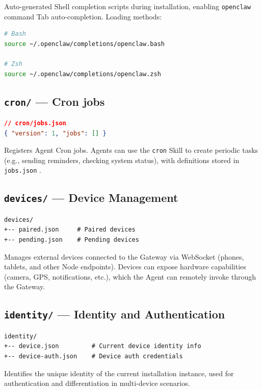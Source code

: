 Auto-generated Shell completion scripts during installation, enabling \texttt{openclaw} command Tab auto-completion. Loading methods:

\begin{lstlisting}[language=bash]
# Bash
source ~/.openclaw/completions/openclaw.bash

# Zsh
source ~/.openclaw/completions/openclaw.zsh
\end{lstlisting}

\subsection{\texttt{cron/} --- Cron jobs}


\begin{lstlisting}[language=json]
// cron/jobs.json
{ "version": 1, "jobs": [] }
\end{lstlisting}

Registers Agent Cron jobs. Agents can use the \texttt{cron}  Skill to create periodic tasks (e.g., sending reminders, checking system status), with definitions stored in \texttt{jobs.json} .

\subsection{\texttt{devices/} --- Device Management}


\begin{lstlisting}
devices/
+-- paired.json     # Paired devices
+-- pending.json    # Pending devices
\end{lstlisting}

Manages external devices connected to the Gateway via WebSocket (phones, tablets, and other Node endpoints). Devices can expose hardware capabilities (camera, GPS, notifications, etc.), which the Agent can remotely invoke through the Gateway.

\subsection{\texttt{identity/} --- Identity and Authentication}


\begin{lstlisting}
identity/
+-- device.json         # Current device identity info
+-- device-auth.json    # Device auth credentials
\end{lstlisting}

Identifies the unique identity of the current installation instance, used for authentication and differentiation in multi-device scenarios.

